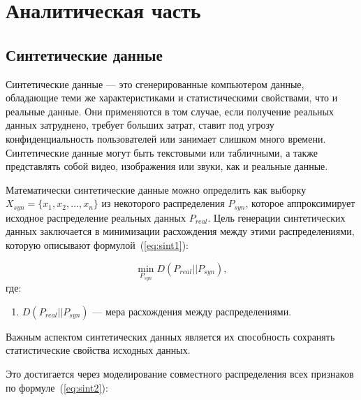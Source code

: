 \chapter{Аналитическая часть}

\section{Синтетические данные}

Синтетические данные --– это сгенерированные компьютером данные,
обладающие теми же характеристиками и статистическими свойствами, что и
реальные данные.
Они применяются в том случае, если получение реальных данных затруднено, требует больших затрат, ставит под угрозу конфиденциальность пользователей или занимает слишком много времени.
Синтетические данные могут быть текстовыми или табличными, а
также представлять собой видео, изображения или звуки, как и реальные данные.~\cite{t}

Математически синтетические данные можно определить как выборку $X_{syn} = \{x_1, x_2, ..., x_n\}$ из некоторого распределения $P_{syn}$, которое аппроксимирует исходное распределение реальных данных $P_{real}$. Цель генерации синтетических данных заключается в минимизации расхождения между этими распределениями, которую описывают формулой~(\ref{eq:sint1}):

\begin{equation}\label{eq:sint1}
    \min_{P_{syn}} D(P_{real} || P_{syn}),
\end{equation}
где:
\begin{enumerate}[label*=---]
	\item  $D(P_{real} || P_{syn})$ --- мера расхождения между распределениями.
\end{enumerate}


Важным аспектом синтетических данных является их способность сохранять статистические свойства исходных данных.~\cite{sin2}

Это достигается через моделирование совместного распределения всех признаков по формуле~(\ref{eq:sint2}):

